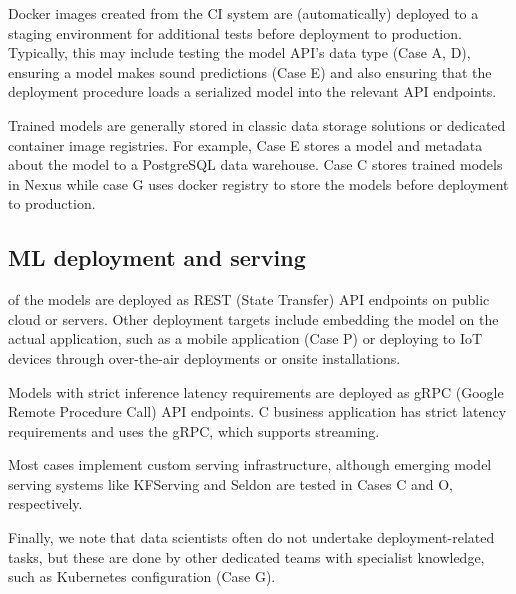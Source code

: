 Docker images created from the CI system are (automatically) deployed to a staging environment for additional tests before deployment to production. Typically, this may include testing the model API's data type (Case A, D), ensuring a model makes sound predictions (Case E) and also ensuring that the deployment procedure loads a serialized model into the relevant API endpoints.

Trained models are generally stored in classic data storage solutions or dedicated container image registries. For example, Case E stores a model and metadata about the model to a PostgreSQL data warehouse. Case C stores trained models in Nexus while case G uses docker registry to store the models before deployment to production.



\subsection{ML deployment and serving}
\DIFdelbegin {}\DIFdelend \DIFaddbegin {}\DIFaddend of the models are deployed as REST (\DIFdelbegin {}\DIFdelend \DIFaddbegin {}\DIFaddend State Transfer) API endpoints on public cloud or \DIFdelbegin {}\DIFdelend \DIFaddbegin {}\DIFaddend servers. Other deployment targets include embedding the model on the actual application, such as a mobile application (Case P) or deploying to IoT devices through over-the-air deployments or onsite installations.

Models with strict inference latency requirements are deployed as gRPC (Google Remote Procedure Call) API endpoints. \DIFdelbegin {}\DIFdelend \DIFaddbegin {}\DIFaddend C business application has strict latency requirements and \DIFaddbegin {}\DIFaddend uses the gRPC, which supports streaming.

Most cases implement custom serving infrastructure, although emerging model serving systems like KFServing and Seldon are tested in Cases C and O, respectively. 

Finally, we note that data scientists often do not undertake deployment-related tasks, but these are done by other dedicated teams with specialist knowledge, such as Kubernetes configuration (Case G).

